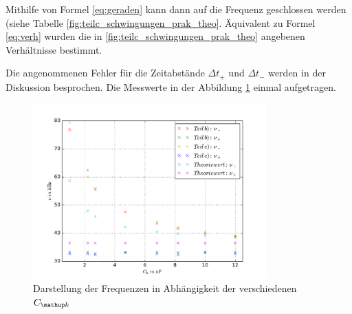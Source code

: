 Mithilfe von Formel \eqref{eq:geraden} kann dann auf die Frequenz geschlossen werden (siehe Tabelle \ref{fig:teilc_schwingungen_prak_theo}.
Äquivalent zu Formel \eqref{eq:verh} wurden die in \ref{fig:teilc_schwingungen_prak_theo} angebenen Verhältnisse bestimmt.

Die angenommenen Fehler für die Zeitabstände $\Delta t_+$ und $\Delta t_-$ werden in der Diskussion besprochen.
Die Messwerte in der Abbildung \ref{fig: plot} einmal aufgetragen.
\begin{figure}
  \centering
  \includegraphics[width=0.8\textwidth]{pics/plot_frequenzen.pdf}
  \caption{Darstellung der Frequenzen in Abhängigkeit der verschiedenen $C\ua{k}$}
  \label{fig: plot}
\end{figure}